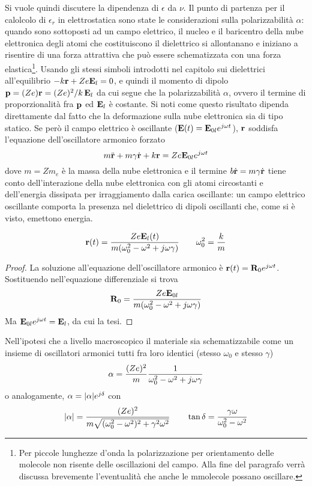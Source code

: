 Si vuole quindi discutere la dipendenza di $\epsilon$ da $\nu$. Il punto di partenza per il calolcolo di $\epsilon_r$
in elettrostatica sono state le considerazioni sulla polarizzabilità $\alpha$:
quando sono sottoposti ad un campo elettrico, il nucleo e
il baricentro della nube elettronica degli atomi che costituiscono il dielettrico si allontanano e iniziano
a risentire di una forza attrattiva che può essere schematizzata con una forza elastica\footnote{Per piccole lunghezze d'onda
la polarizzazione per orientamento delle molecole non risente delle oscillazioni del campo. Alla fine del paragrafo
verrà discussa brevemente l'eventualità che anche le mmolecole possano oscillare.}.
Usando gli stessi simboli introdotti nel capitolo sui dielettrici all'equilibrio $-k\vb{r}+Ze\vb{E}_l=0$,
e quindi il momento di dipolo $\vb{p}=(Ze)\vb{r}=(Ze)^2/k\,\vb{E}_l$ da cui segue che la polarizzabilità $\alpha$,
ovvero il termine di proporzionalità fra $\vb{p}$ ed $\vb{E}_l$ è costante. Si noti come questo risultato
dipenda direttamente dal fatto che la deformazione sulla nube elettronica sia di tipo statico.
Se però il campo elettrico è oscillante ($\vb{E}(t)=\vb{E}_{0l}e^{j\omega t}$), $\vb{r}$
soddisfa l'equazione dell'oscillatore armonico forzato
\[
    m\ddot{\vb{r}} + m\gamma\dot{\vb{r}} + k\vb{r}=Ze\vb{E}_{0l}e^{j\omega t}
\]
dove  $m=Zm_e$ è la massa della nube elettronica e il termine $b\dot{\vb{r}}=m\gamma\dot{\vb{r}}$ tiene conto
dell'interazione della nube elettronica con gli atomi circostanti e dell'energia dissipata per irraggiamento
dalla carica oscillante: un campo elettrico oscillante comporta la presenza nel dielettrico di
dipoli oscillanti che, come si è visto, emettono energia.
\begin{obs}
    \[
        \vb{r}(t)=\frac{Ze\vb{E}_l(t)}{m(\omega_0^2 - \omega^2 + j\omega\gamma)} \quad\quad \omega_0^2=\frac{k}{m}
    \]
    \label{obs:r_dielettrici}
\end{obs}
\begin{proof}
    La soluzione all'equazione dell'oscillatore armonico è $\vb{r}(t)=\vb{R}_0e^{j\omega t}$.
    Sostituendo nell'equazione differenziale si trova
    \[
        \vb{R}_0=\frac{Ze\vb{E}_{0l}}{m(\omega_0^2 - \omega^2 + j\omega\gamma)}
    \]
    Ma $\vb{E}_{0l}e^{j\omega t}=\vb{E}_l$, da cui la tesi.
\end{proof}
\begin{cor}
    Nell'ipotesi che a livello macroscopico il materiale sia schematizzabile come un insieme di
    oscillatori armonici tutti fra loro identici (stesso $\omega_0$ e stesso $\gamma$)
    \[
        \alpha=\frac{(Ze)^2}{m}\frac{1}{\omega_0^2 - \omega^2 + j\omega\gamma}
    \]
    o analogamente, $\alpha=\abs{\alpha}e^{j\delta}$ con
    \[
        \abs{\alpha}=\frac{(Ze)^2}{m\sqrt{(\omega_0^2-\omega^2)^2+\gamma^2\omega^2}} \quad\quad
        \tan{\delta}=\frac{\gamma\omega}{\omega_0^2-\omega^2}
    \]
\end{cor}
